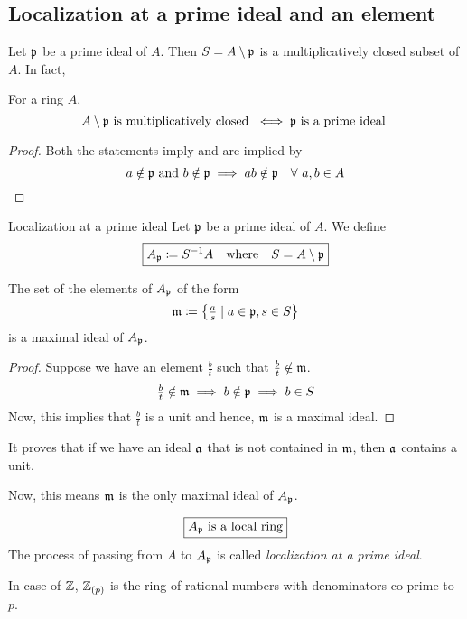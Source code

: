 \pagebreak


\subsection{Localization at a prime ideal and an element}

Let \(\mathfrak{p}\) be a prime ideal of \(A\).
Then \(S = A \setminus \mathfrak{p}\) is a multiplicatively closed
subset of \(A\).
In fact,

\begin{claim}{}{}
	For a ring \(A\),
	\[
		A \setminus \mathfrak{p} \text{ is multiplicatively closed }
		\iff \mathfrak{p} \text{ is a prime ideal }
	\]
\end{claim}

\begin{proof}
	Both the statements imply and are implied by
	\[
		a \notin \mathfrak{p} \text{ and } b \notin \mathfrak{p}
		\implies ab \notin \mathfrak{p} \quad
		\forall\ a, b \in A
		\qedhere
	\]
\end{proof}

\begin{defn}{Localization at a prime ideal}{}
	Let \(\mathfrak{p}\) be a prime ideal of \(A\).
	We define
	\[
		\boxed{
			A_{\mathfrak{p}} \coloneqq S^{-1}A
			\quad \text{where} \quad
			S = A \setminus \mathfrak{p}
		}
	\]
\end{defn}


\begin{claim}{}{}
	The set of the elements of \(A_{\mathfrak{p}}\) of the form
	\[
		\mathfrak{m} \coloneqq \left\{ \textstyle{\frac{a}{s}} \mid a \in \mathfrak{p}, s \in S \right\}
	\]
	is a maximal ideal of \(A_{\mathfrak{p}}\).
\end{claim}
\begin{proof}
	Suppose we have an element \(\frac{b}{t}\) such that
	\(\frac{b}{t} \notin \mathfrak{m}\).
	\[
		\textstyle{\frac{b}{t}} \notin \mathfrak{m}
		\implies b \notin \mathfrak{p}
		\implies b \in S
	\]
	Now, this implies that \(\frac{b}{t}\) is a unit and hence,
	\(\mathfrak{m}\) is a maximal ideal.
\end{proof}

It proves that if we have an ideal \(\mathfrak{a}\) that is not contained in
\(\mathfrak{m}\), then \(\mathfrak{a}\) contains a unit.

Now, this means \(\mathfrak{m}\) is the only maximal ideal of \(A_{\mathfrak{p}}\).

\[
	\boxed{
		A_{\mathfrak{p}} \text{ is a local ring}
	}
\]
The process of passing from \(A\) to \(A_{\mathfrak{p}}\) is called
\emph{localization at a prime ideal}.

In case of \(\ZZ\), \(\ZZ_{(p)}\) is the ring of rational numbers
with denominators co-prime to \(p\).


